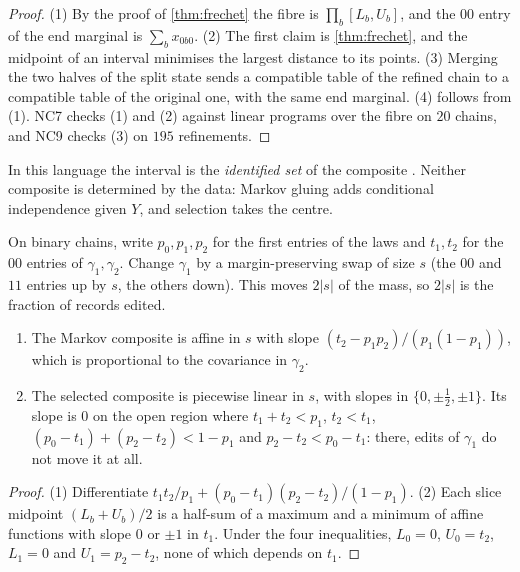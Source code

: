 \documentclass[11pt]{article}
\theoremstyle{definition}\newtheorem{definition}[theorem]{Definition}\newtheorem{remark}[theorem]{Remark}\newtheorem{example}[theorem]{Example}\newtheorem{problem}[theorem]{Open problem}\crefname{problem}{Problem}{Problems}
\begin{document}
\begin{proof}
(1) By the proof of \cref{thm:frechet} the fibre is $\prod_b[L_b,U_b]$, and the $00$ entry of the end marginal is $\sum_bx_{0b0}$. (2) The first claim is \cref{thm:frechet}, and the midpoint of an interval
minimises the largest distance to its points. (3) Merging the two halves of the split state sends a compatible table of the refined chain to a compatible table of the original one, with the same end marginal.
(4) follows from (1). NC7 checks (1) and (2) against linear programs over the fibre on $20$ chains, and NC9 checks (3) on $195$ refinements.
\end{proof}

In this language the interval is the \emph{identified set} of the composite \cite{Manski2003}. Neither composite is determined by the data: Markov gluing adds conditional independence given $Y$, and
selection takes the centre.

\begin{proposition}\label{prop:poison}
On binary chains, write $p_0,p_1,p_2$ for the first entries of the laws and $t_1,t_2$ for the $00$ entries of $\gamma_1,\gamma_2$. Change $\gamma_1$ by a margin-preserving swap of size $s$ (the $00$ and $11$ entries up by $s$, the others down). This moves $2|s|$ of the mass, so $2|s|$ is the fraction of records edited.
\begin{enumerate}
\item[(1)] The Markov composite is affine in $s$ with slope $(t_2-p_1p_2)/(p_1(1-p_1))$, which is proportional to the covariance in $\gamma_2$.
\item[(2)] The selected composite is piecewise linear in $s$, with slopes in $\{0,\pm\tfrac12,\pm1\}$. Its slope is $0$ on the open region where $t_1+t_2<p_1$, $t_2<t_1$, $(p_0-t_1)+(p_2-t_2)<1-p_1$ and $p_2-t_2<p_0-t_1$:
there, edits of $\gamma_1$ do not move it at all.
\end{enumerate}
\end{proposition}

\begin{proof}
(1) Differentiate $t_1t_2/p_1+(p_0-t_1)(p_2-t_2)/(1-p_1)$. (2) Each slice midpoint $(L_b+U_b)/2$ is a half-sum of a maximum and a minimum of affine functions with slope $0$ or $\pm1$ in $t_1$. Under the four
inequalities, $L_0=0$, $U_0=t_2$, $L_1=0$ and $U_1=p_2-t_2$, none of which depends on $t_1$.
\end{proof}
\end{document}
